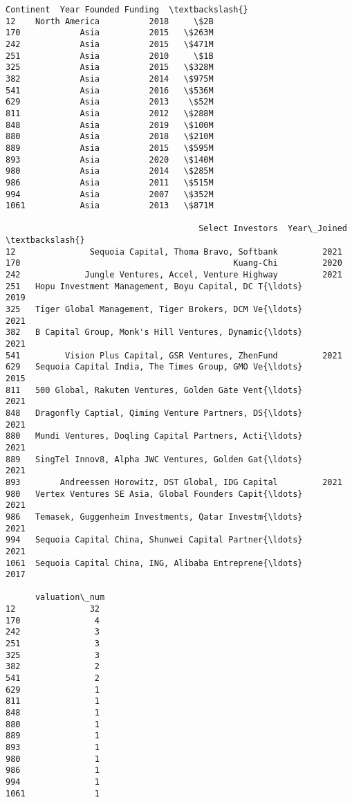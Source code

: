 \documentclass[11pt]{article}
\begin{document}
\begin{tcolorbox}[breakable, size=fbox, boxrule=.5pt, pad at break*=1mm, opacityfill=0]
\begin{Verbatim}[commandchars=\\\{\}]
          Continent  Year Founded Funding  \textbackslash{}
12    North America          2018     \$2B
170            Asia          2015   \$263M
242            Asia          2015   \$471M
251            Asia          2010     \$1B
325            Asia          2015   \$328M
382            Asia          2014   \$975M
541            Asia          2016   \$536M
629            Asia          2013    \$52M
811            Asia          2012   \$288M
848            Asia          2019   \$100M
880            Asia          2018   \$210M
889            Asia          2015   \$595M
893            Asia          2020   \$140M
980            Asia          2014   \$285M
986            Asia          2011   \$515M
994            Asia          2007   \$352M
1061           Asia          2013   \$871M

                                       Select Investors  Year\_Joined  \textbackslash{}
12               Sequoia Capital, Thoma Bravo, Softbank         2021
170                                           Kuang-Chi         2020
242             Jungle Ventures, Accel, Venture Highway         2021
251   Hopu Investment Management, Boyu Capital, DC T{\ldots}         2019
325   Tiger Global Management, Tiger Brokers, DCM Ve{\ldots}         2021
382   B Capital Group, Monk's Hill Ventures, Dynamic{\ldots}         2021
541         Vision Plus Capital, GSR Ventures, ZhenFund         2021
629   Sequoia Capital India, The Times Group, GMO Ve{\ldots}         2015
811   500 Global, Rakuten Ventures, Golden Gate Vent{\ldots}         2021
848   Dragonfly Captial, Qiming Venture Partners, DS{\ldots}         2021
880   Mundi Ventures, Doqling Capital Partners, Acti{\ldots}         2021
889   SingTel Innov8, Alpha JWC Ventures, Golden Gat{\ldots}         2021
893        Andreessen Horowitz, DST Global, IDG Capital         2021
980   Vertex Ventures SE Asia, Global Founders Capit{\ldots}         2021
986   Temasek, Guggenheim Investments, Qatar Investm{\ldots}         2021
994   Sequoia Capital China, Shunwei Capital Partner{\ldots}         2021
1061  Sequoia Capital China, ING, Alibaba Entreprene{\ldots}         2017

      valuation\_num
12               32
170               4
242               3
251               3
325               3
382               2
541               2
629               1
811               1
848               1
880               1
889               1
893               1
980               1
986               1
994               1
1061              1
\end{Verbatim}
\end{tcolorbox}
        
\end{document}
